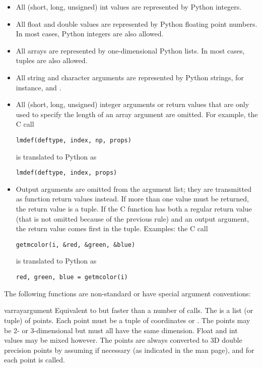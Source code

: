 \begin{itemize}
\item
All (short, long, unsigned) int values are represented by Python
integers.
\item
All float and double values are represented by Python floating point
numbers.
In most cases, Python integers are also allowed.
\item
All arrays are represented by one-dimensional Python lists.
In most cases, tuples are also allowed.
\item
\begin{sloppypar}
All string and character arguments are represented by Python strings,
for instance,
and
.
\end{sloppypar}
\item
All (short, long, unsigned) integer arguments or return values that are
only used to specify the length of an array argument are omitted.
For example, the C call

\begin{verbatim}
lmdef(deftype, index, np, props)
\end{verbatim}

is translated to Python as

\begin{verbatim}
lmdef(deftype, index, props)
\end{verbatim}

\item
Output arguments are omitted from the argument list; they are
transmitted as function return values instead.
If more than one value must be returned, the return value is a tuple.
If the C function has both a regular return value (that is not omitted
because of the previous rule) and an output argument, the return value
comes first in the tuple.
Examples: the C call

\begin{verbatim}
getmcolor(i, &red, &green, &blue)
\end{verbatim}

is translated to Python as

\begin{verbatim}
red, green, blue = getmcolor(i)
\end{verbatim}

\end{itemize}

The following functions are non-standard or have special argument
conventions:

\begin{funcdesc}{varray}{argument}
Equivalent to but faster than a number of
calls.
The  is a list (or tuple) of points.
Each point must be a tuple of coordinates
 or .
The points may be 2- or 3-dimensional but must all have the
same dimension.
Float and int values may be mixed however.
The points are always converted to 3D double precision points
by assuming  if necessary (as indicated in the man page),
and for each point
is called.
\end{funcdesc}

